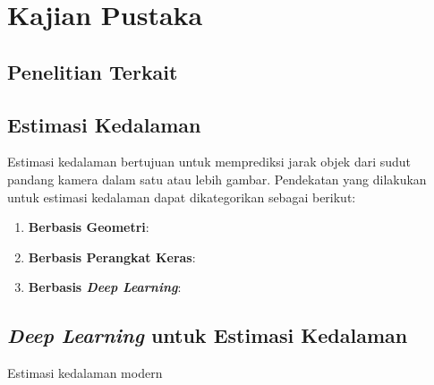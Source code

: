 \chapter{Kajian Pustaka}

\section{Penelitian Terkait}

\section{Estimasi Kedalaman}
Estimasi kedalaman bertujuan untuk memprediksi jarak objek dari sudut pandang kamera dalam satu atau lebih gambar.
Pendekatan yang dilakukan untuk estimasi kedalaman dapat dikategorikan sebagai berikut:
\begin{enumerate}
    \item \textbf{Berbasis Geometri}: 
    \item \textbf{Berbasis Perangkat Keras}:
    \item \textbf{Berbasis \textit{Deep Learning}}:
\end{enumerate}





\section{\textit{Deep Learning} untuk Estimasi Kedalaman}
Estimasi kedalaman modern 

